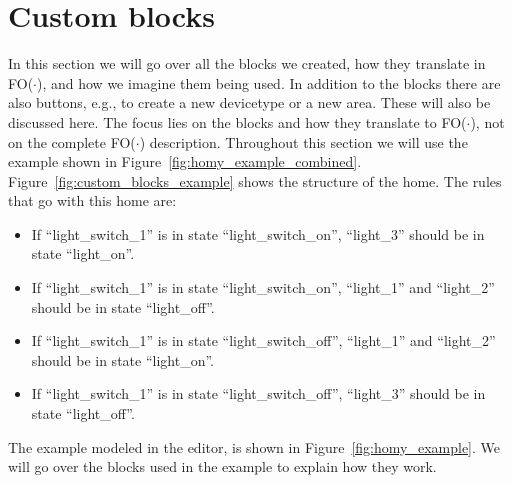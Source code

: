 \documentclass[11pt,a4paper]{report}
\newcommand{\fodot}{FO($\cdot$)\xspace}
\begin{document}
\section{Custom blocks}
\label{custom_blocks}
In this section we will go over all the blocks we created, how they translate in \fodot, and how we imagine them being used. In addition to the blocks there are also buttons, e.g., to create a new devicetype or a new area. These will also be discussed here. The focus lies on the blocks and how they translate to \fodot, not on the complete \fodot description. Throughout this section we will use the example shown in Figure~\ref{fig:homy_example_combined}. Figure~\ref{fig:custom_blocks_example} shows the structure of the home. The rules that go with this home are:
\begin{itemize}
    \item If ``light\_switch\_1'' is in state ``light\_switch\_on'', ``light\_3'' should be in state ``light\_on''.
    \item If ``light\_switch\_1'' is in state ``light\_switch\_on'', ``light\_1'' and ``light\_2'' should be in state ``light\_off''.
    \item If ``light\_switch\_1'' is in state ``light\_switch\_off'', ``light\_1'' and ``light\_2'' should be in state ``light\_on''.
    \item If ``light\_switch\_1'' is in state ``light\_switch\_off'', ``light\_3'' should be in state ``light\_off''.
\end{itemize}
The example modeled in the editor, is shown in Figure~\ref{fig:homy_example}. We will go over the blocks used in the example to explain how they work. 
\end{document}
